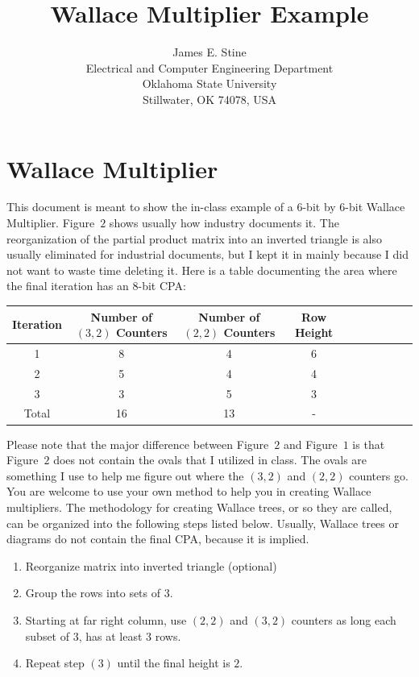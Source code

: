 \documentclass{article}
\begin{document}
\title{Wallace Multiplier Example}
\author{James E. Stine \\
Electrical and Computer Engineering Department\\
Oklahoma State University \\
Stillwater, OK 74078, USA}
\date{}

\maketitle

\section{Wallace Multiplier}
This document is meant to show the in-class example of a $6$-bit by $6$-bit
Wallace Multiplier.  Figure~$2$ shows usually how industry
documents it.  The reorganization of the partial product matrix into an
inverted triangle is also usually eliminated for industrial documents, but I
kept it in mainly because I did not want to waste time deleting it.  Here is
a table documenting the area where the final iteration has an $8$-bit CPA:
  \begin{table} [h]
    \centering
    \begin{tabular}{|c|c|c|c|c|c|c|c|c|c|} \hline
    Iteration & Number of $(3,2)$ Counters & Number of $(2,2)$ Counters & Row Height
      \\ \hline \hline
      1 & 8 & 4 & 6 \\ \hline
      2 & 5 & 4 & 4 \\ \hline
      3 & 3 & 5 & 3 \\ \hline \hline
  Total & 16 & 13 & - \\ \hline
    \end{tabular}
  \end{table}

Please note that the major difference between Figure~$2$ and
Figure~$1$ is that Figure~$2$ does not contain
the ovals that I utilized in class.  The ovals are something I use to help me
figure out where the $(3,2)$ and $(2,2)$ counters go.  You are welcome to use
your own method to help you in creating Wallace multipliers.  The methodology
for creating Wallace trees, or so they are called, can
be organized into the following steps listed below.  Usually, Wallace trees or
diagrams do not contain the final CPA, because it is implied.
\begin{enumerate}
\item Reorganize matrix into inverted triangle (optional)
\item Group the rows into sets of $3$.
\item Starting at far right column, use $(2,2)$ and $(3,2)$ counters as long 
each subset of $3$, has at least $3$ rows.
\item Repeat step $(3)$ until the final height is $2$.
\end{enumerate}
\end{document}
